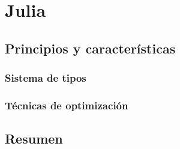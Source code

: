 \chapter{Julia}

\section{Principios y características}

\subsection{Sistema de tipos}

\subsection{Técnicas de optimización}

\section{Resumen}
 
 
